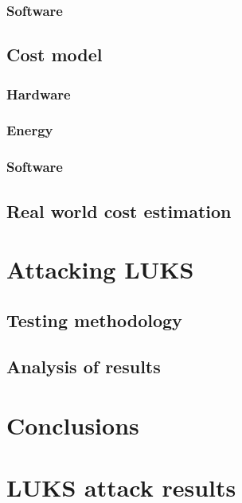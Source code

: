 \documentclass[nolof]{fithesis3}
\begin{document}
\subsection{Software}

\section{Cost model}

\subsection{Hardware}

\subsection{Energy}

\subsection{Software}

\section{Real world cost estimation}

\chapter{Attacking LUKS}

\section{Testing methodology}


\section{Analysis of results}

\chapter{Conclusions}

\printbibliography

\appendix
\chapter{LUKS attack results}
\end{document}
